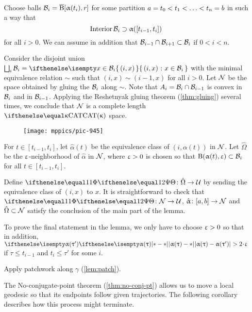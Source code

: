 Choose balls $\mathcal{B}_i=\overline{\mathrm{B}}{}[\upalpha(t_i),r]$
for some partition $a\z=t_0<t_1\z<\z\dots\z<t_n\z=b$
in such a way that 
\[\Int\spc{B}_i\supset \alpha([t_{i-1},t_i])\]
for all $i>0$.
We can assume in addition that $\spc{B}_{i-1}\cap \spc{B}_{i+1}\subset \spc{B}_{i}$ if $0<i<n$.

Consider the disjoint union $\bigsqcup_i\spc{B}_i=\set{(i,x)}{x\in\spc{B}_i}$ with the minimal equivalence relation $\sim$ such that $(i,x)\sim(i-1,x)$ for all $i>0$.
Let $\mathcal{N}$ be the space obtained by gluing the $\mathcal{B}_i$ along $\sim$.
Note that $A_i=\spc{B}_i\cap\spc{B}_{i-1}$ is convex in $\mathcal{B}_i$ and in $\mathcal{B}_{i-1}$.
Applying the Reshetnyak gluing theorem (\ref{thm:gluing}) several times, 
we conclude that $\mathcal{N}$ is a complete length $\CAT\kappa$ space.

\begin{figure}[!ht]
\vskip-0mm
\centering
\texttt{[image: mppics/pic-945]}
\end{figure}

For $t\in[t_{i-1},t_i]$, let $\hat\alpha(t)$  be the equivalence class of $(i,\alpha(t))$ in $\mathcal{N}$.
Let $\hat\Omega$ be the $\upvarepsilon$-neighborhood of $\hat\alpha$ in $\mathcal{N}$, where $\upvarepsilon>0$ is chosen so that $\oBall(\alpha(t),\eps)\subset\spc{B}_i$ for all $t\in[t_{i-1},t_i]$.

Define $\map\:\hat\Omega\to\spc{U}$
by sending the equivalence class of $(i,x)$ to $x$.
It is straightforward to check that $\map\:\spc{N}\to\spc{U}$, $\hat\alpha\:[a,b]\to\spc{N}$ and $\hat\Omega\subset\spc{N}$ satisfy the conclusion of the main part of the lemma.

To prove the final statement in the lemma,
we only have to choose $\upvarepsilon>0$ so that in addition, $\dist{\alpha(\tau)}{\alpha(\tau')}{}>2\cdot\eps$ if $\tau\le t_{i-1}$ and $t_i\le\tau'$ for some $i$.
\qeds


Apply patchwork along $\gamma$ (\ref{lem:patch}). 
\qeds



The No-conjugate-point theorem (\ref{thm:no-conj-pt}) allows us to move a local geodesic  
so that its endpoints follow given trajectories.
The following corollary describes how this process might terminate. 


